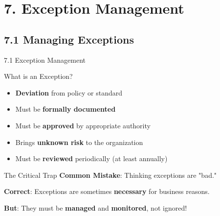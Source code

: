 \documentclass{beamer}
\begin{document}
	\section{7. Exception Management}
	
	\subsection{7.1 Managing Exceptions}
	\begin{frame}{7.1 Exception Management}
		\begin{block}{What is an Exception?}
			\begin{itemize}
				\item \textbf{Deviation} from policy or standard
				\item Must be \textbf{formally documented}
				\item Must be \textbf{approved} by appropriate authority
				\item Brings \textbf{unknown risk} to the organization
				\item Must be \textbf{reviewed} periodically (at least annually)
			\end{itemize}
		\end{block}
		
		\begin{alertblock}{The Critical Trap}
			\textbf{Common Mistake}: Thinking exceptions are "bad."
			
			\textbf{Correct}: Exceptions are sometimes \textbf{necessary} for business reasons.
			
			\textbf{But}: They must be \textbf{managed} and \textbf{monitored}, not ignored!
		\end{alertblock}
	\end{frame}
	
\end{document}
